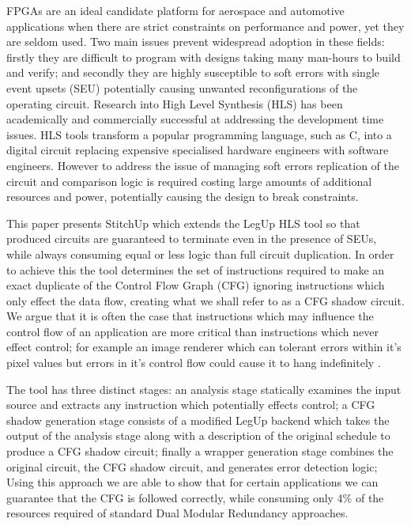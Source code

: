 FPGAs are an ideal candidate platform for aerospace and automotive applications
when there are strict constraints on performance and power, yet they are seldom used.
Two main issues prevent widespread adoption in these fields: firstly they are difficult
to program with designs taking many man-hours to build and verify;
and secondly they are highly susceptible to soft errors with single event upsets (SEU)
potentially causing unwanted reconfigurations of the operating circuit.
Research into High Level Synthesis (HLS) has been academically and commercially successful
at addressing the development time issues. HLS tools transform a popular programming language, such as C,
into a digital circuit replacing expensive specialised hardware engineers with software engineers.
However to address the issue of managing soft errors replication of the circuit and comparison logic is required
costing large amounts of additional resources and power, potentially causing the design to break constraints.

This paper presents StitchUp which extends the LegUp HLS tool \cite{canis2011legup} so that produced circuits are
guaranteed to terminate even in the presence of SEUs, while always consuming equal or less logic than full circuit duplication.
In order to achieve this the tool determines the set of instructions required to make an exact duplicate of the Control
Flow Graph (CFG) ignoring instructions which only effect the data flow, creating what we shall refer to as a CFG shadow circuit.
We argue that it is often the case that instructions which may influence the control flow of an application are more critical
than instructions which never effect control; for example an image renderer which can tolerant errors within
it's pixel values but errors in it's control flow could cause it to hang indefinitely \cite{sampson2011enerj}.

The tool has three distinct stages: an analysis stage statically examines the input source and extracts any instruction
which potentially effects control; a CFG shadow generation stage consists of a modified LegUp backend
which takes the output of the analysis stage along with a description of the original schedule to produce a CFG shadow circuit;
finally a wrapper generation stage combines the original circuit, the CFG shadow circuit, and generates error detection logic;
Using this approach we are able to show that for certain applications we can guarantee that the CFG
is followed correctly, while consuming only 4\% of the resources required of standard Dual Modular Redundancy approaches.

